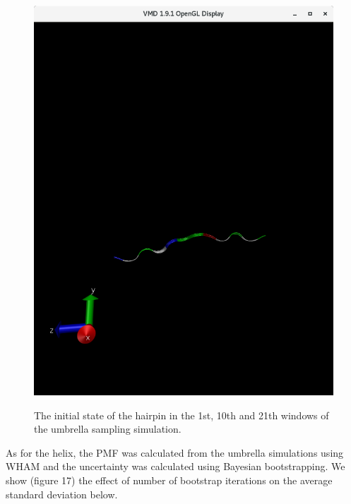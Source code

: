 \documentclass[12pt, onecolumn]{revtex4}    %
\begin{document}
\begin{figure}[h!]
\includegraphics[scale=0.2]{HairpinLastRibbons}
\label{fig: HairpinVis}
\caption{The initial state of the hairpin in the 1st, 10th and 21th windows of the umbrella sampling simulation.}
\end{figure}

As for the helix, the PMF was calculated from the umbrella simulations using WHAM and the uncertainty was calculated using Bayesian bootstrapping.  We show (figure 17) the effect of number of bootstrap iterations on the average standard deviation below. \\
\end{document}
